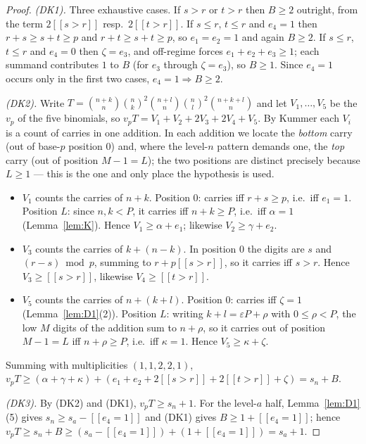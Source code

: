\documentclass[11pt,reqno]{amsart}
\theoremstyle{plain}
\theoremstyle{definition}
\theoremstyle{remark}
\numberwithin{equation}{section}
\newcommand{\ii}[1]{[\![#1]\!]}
\begin{document}
\begin{proof}
\emph{(DK1).} Three exhaustive cases. If $s>r$ or $t>r$ then $B\ge2$ outright, from the term
$2\ii{s>r}$ resp.\ $2\ii{t>r}$. If $s\le r$, $t\le r$ and $e_4=1$ then $r+s\ge s+t\ge p$ and
$r+t\ge s+t\ge p$, so $e_1=e_2=1$ and again $B\ge2$. If $s\le r$, $t\le r$ and $e_4=0$ then
$\zeta=e_3$, and off-regime forces $e_1+e_2+e_3\ge1$; each summand contributes $1$ to $B$ (for
$e_3$ through $\zeta=e_3$), so $B\ge1$. Since $e_4=1$ occurs only in the first two cases,
$e_4=1\Rightarrow B\ge2$.

\emph{(DK2).} Write $T=\binom{n+k}{n}\binom nk^2\binom{n+l}{n}\binom nl^2\binom{n+k+l}{n}$ and
let $V_1,\dots,V_5$ be the $v_p$ of the five binomials, so $v_pT=V_1+V_2+2V_3+2V_4+V_5$. By
Kummer each $V_i$ is a count of carries in one addition. In each addition we locate the
\emph{bottom} carry (out of base-$p$ position $0$) and, where the level-$n$ pattern demands
one, the \emph{top} carry (out of position $M-1=L$); the two positions are distinct precisely
because $L\ge1$ --- this is the one and only place the hypothesis is used.
\begin{itemize}[leftmargin=1.6em]
\item $V_1$ counts the carries of $n+k$. Position $0$: carries iff $r+s\ge p$, i.e.\ iff
  $e_1=1$. Position $L$: since $n,k<P$, it carries iff $n+k\ge P$, i.e.\ iff $\alpha=1$
  (Lemma~\ref{lem:K}). Hence $V_1\ge\alpha+e_1$; likewise $V_2\ge\gamma+e_2$.
\item $V_3$ counts the carries of $k+(n-k)$. In position $0$ the digits are $s$ and
  $(r-s)\bmod p$, summing to $r+p\ii{s>r}$, so it carries iff $s>r$. Hence $V_3\ge\ii{s>r}$,
  likewise $V_4\ge\ii{t>r}$.
\item $V_5$ counts the carries of $n+(k+l)$. Position $0$: carries iff $\zeta=1$
  (Lemma~\ref{lem:D1}(2)). Position $L$: writing $k+l=\varepsilon P+\rho$ with $0\le\rho<P$,
  the low $M$ digits of the addition sum to $n+\rho$, so it carries out of position $M-1=L$ iff
  $n+\rho\ge P$, i.e.\ iff $\kappa=1$. Hence $V_5\ge\kappa+\zeta$.
\end{itemize}
Summing with multiplicities $(1,1,2,2,1)$,
$v_pT\ge(\alpha+\gamma+\kappa)+(e_1+e_2+2\ii{s>r}+2\ii{t>r}+\zeta)=s_n+B$.

\emph{(DK3).} By (DK2) and (DK1), $v_pT\ge s_n+1$. For the level-$a$ half,
Lemma~\ref{lem:D1}(5) gives $s_n\ge s_a-\ii{e_4=1}$ and (DK1) gives $B\ge1+\ii{e_4=1}$; hence
$v_pT\ge s_n+B\ge(s_a-\ii{e_4=1})+(1+\ii{e_4=1})=s_a+1$.
\end{proof}
\end{document}
